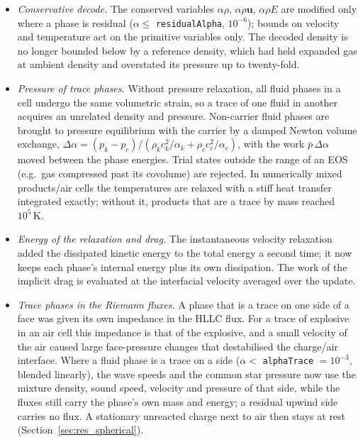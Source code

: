 \documentclass{article}
\begin{document}
\begin{itemize}
    \item \emph{Conservative decode.} The conserved variables $\alpha\rho$, $\alpha\rho\mathbf{u}$, $\alpha\rho E$ are modified only where a phase is residual ($\alpha \le$ \texttt{residualAlpha}, $10^{-6}$); bounds on velocity and temperature act on the primitive variables only. The decoded density is no longer bounded below by a reference density, which had held expanded gas at ambient density and overstated its pressure up to twenty-fold.
    \item \emph{Pressure of trace phases.} Without pressure relaxation, all fluid phases in a cell undergo the same volumetric strain, so a trace of one fluid in another acquires an unrelated density and pressure. Non-carrier fluid phases are brought to pressure equilibrium with the carrier by a damped Newton volume exchange, $\Delta\alpha = (p_k - p_c)/(\rho_k c_k^2/\alpha_k + \rho_c c_c^2/\alpha_c)$, with the work $\bar p\,\Delta\alpha$ moved between the phase energies. Trial states outside the range of an EOS (e.g.\ gas compressed past its covolume) are rejected. In numerically mixed products/air cells the temperatures are relaxed with a stiff heat transfer integrated exactly; without it, products that are a trace by mass reached $10^5\,\text{K}$.
    \item \emph{Energy of the relaxation and drag.} The instantaneous velocity relaxation added the dissipated kinetic energy to the total energy a second time; it now keeps each phase's internal energy plus its own dissipation. The work of the implicit drag is evaluated at the interfacial velocity averaged over the update.
    \item \emph{Trace phases in the Riemann fluxes.} A phase that is a trace on one side of a face was given its own impedance in the HLLC flux. For a trace of explosive in an air cell this impedance is that of the explosive, and a small velocity of the air caused large face-pressure changes that destabilised the charge/air interface. Where a fluid phase is a trace on a side ($\alpha <$ \texttt{alphaTrace} $= 10^{-3}$, blended linearly), the wave speeds and the common star pressure now use the mixture density, sound speed, velocity and pressure of that side, while the fluxes still carry the phase's own mass and energy; a residual upwind side carries no flux. A stationary unreacted charge next to air then stays at rest (Section~\ref{sec:res_spherical}).

\end{itemize}
\end{document}
